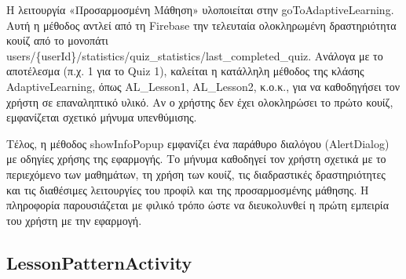 \documentclass[11pt]{report}
\begin{document}
Η λειτουργία «Προσαρμοσμένη Μάθηση» υλοποιείται στην goToAdaptiveLearning. Αυτή η μέθοδος αντλεί από τη Firebase την τελευταία ολοκληρωμένη δραστηριότητα κουίζ από το μονοπάτι users/\{userId\}/statistics/quiz\_statistics/last\_completed\_quiz. Ανάλογα με το αποτέλεσμα (π.χ. 1 για το Quiz 1), καλείται η κατάλληλη μέθοδος της κλάσης AdaptiveLearning, όπως AL\_Lesson1, AL\_Lesson2, κ.ο.κ., για να καθοδηγήσει τον χρήστη σε επαναληπτικό υλικό. Αν ο χρήστης δεν έχει ολοκληρώσει το πρώτο κουίζ, εμφανίζεται σχετικό μήνυμα υπενθύμισης.

Τέλος, η μέθοδος showInfoPopup εμφανίζει ένα παράθυρο διαλόγου (AlertDialog) με οδηγίες χρήσης της εφαρμογής. Το μήνυμα καθοδηγεί τον χρήστη σχετικά με το περιεχόμενο των μαθημάτων, τη χρήση των κουίζ, τις διαδραστικές δραστηριότητες και τις διαθέσιμες λειτουργίες του προφίλ και της προσαρμοσμένης μάθησης. Η πληροφορία παρουσιάζεται με φιλικό τρόπο ώστε να διευκολυνθεί η πρώτη εμπειρία του χρήστη με την εφαρμογή.

\subsection{LessonPatternActivity}
\end{document}
